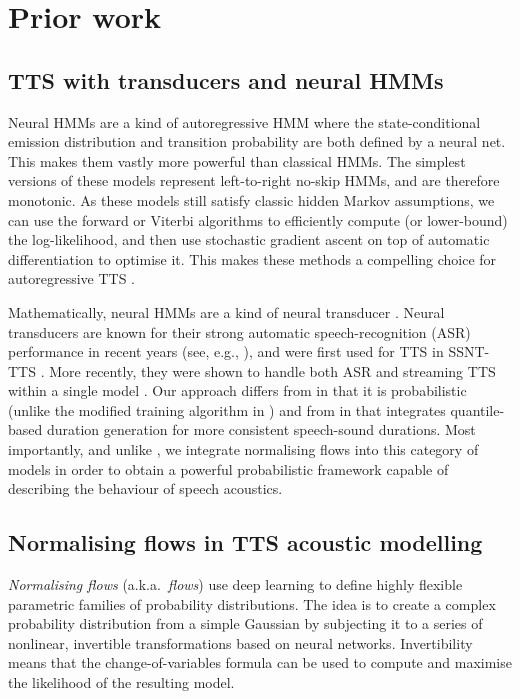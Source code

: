 \documentclass[british]{INTERSPEECH2023_arxiv}
\begin{document}
\section{Prior work}
\label{sec:background}

\subsection{TTS with transducers and neural HMMs}
Neural HMMs \cite{tran2016unsupervised} are a kind of autoregressive HMM \cite{rabiner1989tutorial,shannon2013autoregressive} where the state-conditional emission distribution and transition probability are both defined by a neural net.
This makes them vastly more powerful than classical HMMs.
The simplest versions of these models represent left-to-right no-skip HMMs, and are therefore monotonic.
As these models still satisfy classic hidden Markov assumptions, we can use the forward or Viterbi algorithms \cite{rabiner1989tutorial} to efficiently compute (or lower-bound) the log-likelihood, and then use stochastic gradient ascent on top of automatic differentiation to optimise it.
This makes these methods a compelling choice for autoregressive TTS \cite{mehta2022neural}.

Mathematically, neural HMMs are a kind of neural transducer \cite{yu2016online}.
Neural transducers are known for their strong automatic speech-recognition (ASR) performance in recent years (see, e.g., \cite{zhang2020pushing}), and were first used for TTS in SSNT-TTS \cite{yasuda2019initial}.
More recently, they were shown to handle both ASR and streaming TTS within a single model \cite{chen2021speech}.
Our approach differs from \cite{chen2021speech} in that it is probabilistic (unlike the modified training algorithm in \cite{chen2021speech}) and from \cite{yasuda2019initial} in that integrates quantile-based duration generation \cite{ronanki2016median,henter2017nonparametric} for more consistent speech-sound durations.
Most importantly, and unlike \cite{yasuda2019initial,chen2021speech,mehta2022neural}, we integrate normalising flows into this category of models in order to obtain a powerful probabilistic framework capable of describing the behaviour of speech acoustics.

\subsection{Normalising flows in TTS acoustic modelling}
\emph{Normalising flows} (a.k.a.\ \emph{flows}) \cite{papamakarios2021normalizing,kobyzev2021normalizing}
use deep learning to define highly flexible parametric families of probability distributions.
The idea is to create a complex probability distribution from a simple Gaussian by subjecting it to a series of nonlinear, invertible transformations based on neural networks.
Invertibility means that the change-of-variables formula can be used to compute and maximise the likelihood of the resulting model.
\end{document}
